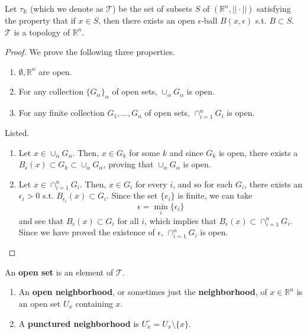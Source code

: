   \begin{theorem}
    Let $\tau_{\mathbb{R}}$ (which we denote as $\mathscr{T}$) be the set of subsets $S$ of $(\mathbb{R}^n, || \cdot ||)$ satisfying the property that if $x \in S$, then there exists an open $\epsilon$-ball $B(x, \epsilon)$ s.t. $B \subset S$. $\mathscr{T}$ is a topology of $\mathbb{R}^n$. 
  \end{theorem} 
  \begin{proof} 
    We prove the following three properties. 
    \begin{enumerate}
      \item $\emptyset, \mathbb{R}^n$ are open. 
      \item For any collection $\{G_\alpha\}_\alpha$ of open sets, $\cup_\alpha G_\alpha$ is open.  
      \item For any finite collection $G_1, \ldots, G_n$ of open sets, $\cap_{i=1}^n G_i$ is open. 
    \end{enumerate}
    Listed. 
    \begin{enumerate}
      \item Let $x \in \cup_\alpha G_\alpha$. Then, $x \in G_k$ for some $k$ and since $G_k$ is open, there exists a $B_\epsilon (x) \subset G_k \subset \cup_{\alpha} G_\alpha$, proving that $\cup_\alpha G_\alpha$ is open. 
      \item Let $x \in \cap_{i=1}^n G_i$. Then, $x \in G_i$ for every $i$, and so for each $G_i$, there exists an $\epsilon_i > 0$ s.t. $B_{\epsilon_i} (x) \subset G_i$. Since the set $\{e_i\}$ is finite, we can take 
      \[\epsilon = \min_i \{\epsilon_i\}\]
      and see that $B_\epsilon (x) \subset G_i$ for all $i$, which implies that $B_\epsilon (x) \subset \cap_{i=1}^n G_i$. Since we have proved the existence of $\epsilon$, $\cap_{i=1}^n G_i$ is open. 
    \end{enumerate}
  \end{proof}

  \begin{definition}
    An \textbf{open set} is an element of $\mathscr{T}$. 
    \begin{enumerate}
      \item An \textbf{open neighborhood}, or sometimes just the \textbf{neighborhood}, of $x \in \mathbb{R}^n$ is an open set $U_x$ containing $x$. 
      \item A \textbf{punctured neighborhood} is $U_x^{\circ} = U_x \setminus \{x\}$. 
    \end{enumerate}
  \end{definition}

